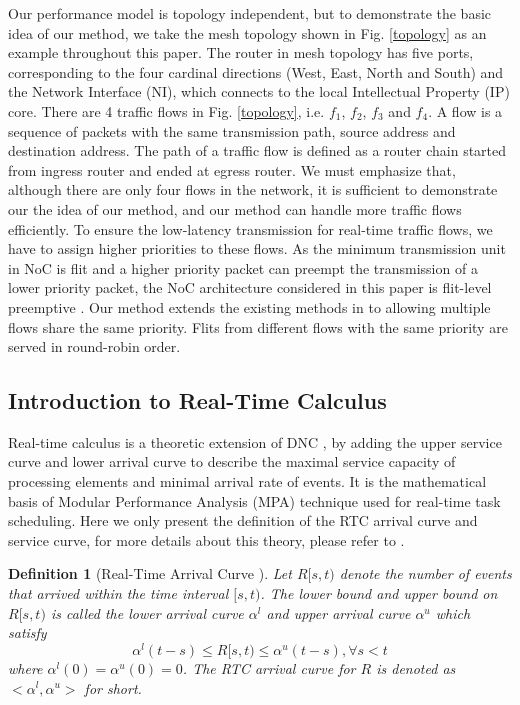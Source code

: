 \documentclass[10pt,journal]{IEEEtran}
\newtheorem{definition}{Definition}
\begin{document}
Our performance model is topology independent, but to demonstrate the basic idea of our method, we take the mesh topology shown in Fig. \ref{topology} as an example throughout this paper. The router in mesh topology has five ports, corresponding to the four cardinal directions (West, East, North and South) and the Network Interface (NI), which connects to the local Intellectual Property (IP) core. There are 4 traffic flows in Fig. \ref{topology}, i.e. $f_1$, $f_2$, $f_3$ and $f_4$. A flow is a sequence of packets with the same transmission path, source address and destination address. The path of a traffic flow is defined as a router chain started from ingress router and ended at egress router. We must emphasize that, although there are only four flows in the network, it is sufficient to demonstrate our the idea of our method, and our method can handle more traffic flows efficiently. To ensure the low-latency transmission for real-time traffic flows, we have to assign higher priorities to these flows. As the minimum transmission unit in NoC is flit and a higher priority packet can preempt the transmission of a lower priority packet, the NoC architecture considered in this paper is flit-level preemptive \cite{Lee:2003:RWC:846077.846083}. Our method extends the existing methods in \cite{73}\cite{Qian489900} to allowing multiple flows share the same priority. Flits from different flows with the same priority are served in round-robin order.

\subsection{Introduction to Real-Time Calculus}\label{intrortc}
Real-time calculus \cite{1253607} is a theoretic extension of DNC \cite{Boudec2001Network}, by adding the upper service curve and lower arrival curve to describe the maximal service capacity of processing elements and minimal arrival rate of events. It is the mathematical basis of Modular Performance Analysis (MPA) \cite{Wandeler2006System} technique used for real-time task scheduling. Here we only present the definition of the RTC arrival curve and service curve, for more details about this theory, please refer to \cite{1253607}.
\begin{definition}[Real-Time Arrival Curve \cite{1253607}]
Let $R[s,t)$ denote the number of events that arrived within the time interval $[s,t)$. The lower bound and upper bound on $R[s,t)$ is called the lower arrival curve $\alpha^l$ and upper arrival curve $\alpha^u$ which satisfy
$$\alpha^l(t-s)\leq R[s,t)\leq \alpha^u(t-s),\forall s<t$$
where $\alpha^l(0)=\alpha^u(0)=0$. The RTC arrival curve for $R$ is denoted as $<\alpha^l,\alpha^u>$ for short.
\end{definition}
\end{document}
